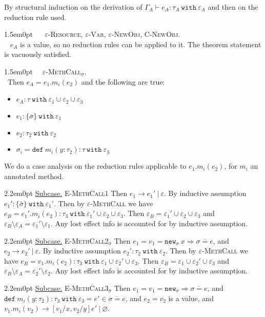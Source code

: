 \documentclass{llncs}
\newcommand{\keywadj}[1]{\mathtt{#1}}
\newcommand{\keyw}[1]{\keywadj{#1}~}
\newcommand{\proofcase}[2]{
	\begin{adjustwidth}{1.5em}{0pt}
		\fbox{Case.}~~#1. \\ ~#2
	\end{adjustwidth}
}
\newcommand{\subcase}[1] {
	\begin{adjustwidth}{2.2em}{0pt}
		\underline{Subcase.} #1
	\end{adjustwidth}
}
\begin{document}
{ By structural induction on the derivation of $\Gamma_A \vdash e_A : \tau_A~\keyw{with} \varepsilon_A$ and then on the reduction rule used. \\

	\proofcase{ \textsc{$\varepsilon$-Resource}, \textsc{$\varepsilon$-Var}, \textsc{$\varepsilon$-NewObj}, \textsc{C-NewObj}} {
		$e_A$ is a value, so no reduction rules can be applied to it. The theorem statement is vacuously satisfied.\\ }
	
	\proofcase{\textsc{$\varepsilon$-MethCall$_{\sigma}$}}
	{Then $e_A = e_1.m_i(e_2)$ and the following are true:
\begin{itemize}
	\item $e_A : \tau~\keyw{with} \varepsilon_1 \cup \varepsilon_2 \cup \varepsilon_3$
	\item $e_1  : \{ \overline \sigma \}~ \keyw{with} \varepsilon_1$
	\item $e_2 : \tau_2~\keyw{with} \varepsilon_2$
	\item $\sigma_i = \keyw{def} m_i(y : \tau_2) : \tau~ \keyw{with} \varepsilon_3$
\end{itemize}
We do a case analysis on the reduction rules applicable to $e_1.m_i(e_2)$, for $m_i$ an annotated method.

		\subcase{ \textsc{E-MethCall1} Then $e_1 \longrightarrow e_1'~|~\varepsilon$. By inductive assumption $e_1' : \{ \bar \sigma \}~\keyw{with} \varepsilon_1'$. Then by \textsc{$\varepsilon$-MethCall} we have $e_B = e_1'.m_i(e_2) : \tau_3~\keyw{with} \varepsilon_1' \cup \varepsilon_2 \cup \varepsilon_3$. Then $\varepsilon_B = \varepsilon_1' \cup \varepsilon_2 \cup \varepsilon_3$ and $\varepsilon_B \setminus \varepsilon_A = \varepsilon_1' \setminus \varepsilon_1$. Any lost effect info is accounted for by inductive assumption.}
		
		\subcase{ \textsc{E-MethCall2$_\sigma$} 	Then $e_1 = v_1 = \keywadj{new}_{\sigma}~x \Rightarrow \overline{\sigma = e}$, and $e_2 \longrightarrow e_2'~|~\varepsilon$. By inductive assumption $e_2' : \tau_2~\keyw{with} \varepsilon_2$. Then by \textsc{$\varepsilon$-MethCall} we have $e_B = v_1.m_i(e_2) : \tau_3~\keyw{with} \varepsilon_1 \cup \varepsilon_2' \cup \varepsilon_3$. Then $\varepsilon_B = \varepsilon_1 \cup \varepsilon_2' \cup \varepsilon_3$ and $\varepsilon_B \setminus \varepsilon_A = \varepsilon_2' \setminus \varepsilon_2$. Any lost effect info is accounted for by inductive assumption.}
		
		\subcase{ \textsc{E-MethCall3$_\sigma$} Then $e_1 = v_1 = \keywadj{new}_{\sigma} \Rightarrow \overline{\sigma = e}$, and $\keyw{def} m_i(y : \tau_2) : \tau_3~\keyw{with} \varepsilon_3 = e' \in \overline{\sigma = e}$, and $e_2 = v_2$ is a value, and $v_1.m_i(v_2) \longrightarrow [v_1/x, v_2/y]e'~|~\varnothing$.
	
}}}
\end{document}
